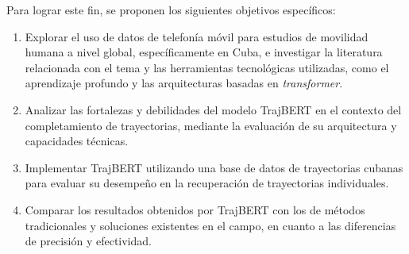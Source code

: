  Para lograr este fin, se proponen los siguientes objetivos específicos:

 \begin{enumerate}
    \item Explorar el uso de datos de telefonía móvil para estudios de movilidad humana a nivel global, específicamente en Cuba, e investigar la literatura relacionada con el tema y las herramientas tecnológicas utilizadas, como el aprendizaje profundo y las arquitecturas basadas en \textit{transformer}.
    \item Analizar las fortalezas y debilidades del modelo TrajBERT en el contexto del completamiento de trayectorias, mediante la evaluación de su arquitectura y capacidades técnicas.
    \item Implementar TrajBERT utilizando una base de datos de trayectorias cubanas para evaluar su desempeño en la recuperación de trayectorias individuales.
    \item Comparar los resultados obtenidos por TrajBERT con los de métodos tradicionales y soluciones existentes en el campo, en cuanto a las diferencias de precisión y efectividad.
\end{enumerate}



